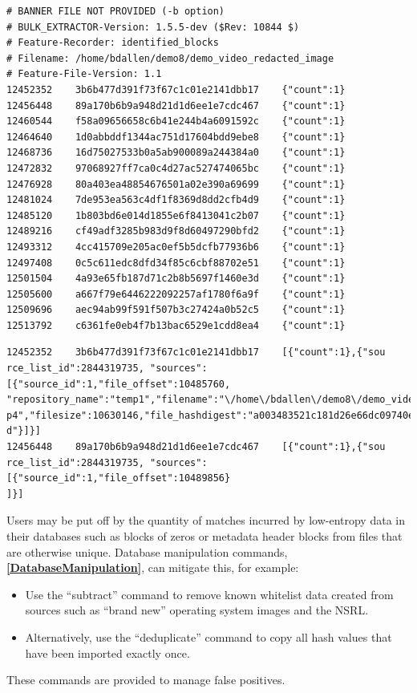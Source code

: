 \documentclass[11pt,fleqn]{article} %
\begin{document}
\lstset{style=customfile}
\begin{lstlisting}[float, caption={The \texttt{identified\_blocks.txt} file produced by \bulk's \textit{hashdb} scanner. First column is the forensic path, second is the hash value, and third is the number of times the hash value occurs in the database}, label=identifiedBlocks]
# BANNER FILE NOT PROVIDED (-b option)
# BULK_EXTRACTOR-Version: 1.5.5-dev ($Rev: 10844 $)
# Feature-Recorder: identified_blocks
# Filename: /home/bdallen/demo8/demo_video_redacted_image
# Feature-File-Version: 1.1
12452352	3b6b477d391f73f67c1c01e2141dbb17	{"count":1}
12456448	89a170b6b9a948d21d1d6ee1e7cdc467	{"count":1}
12460544	f58a09656658c6b41e244b4a6091592c	{"count":1}
12464640	1d0abbddf1344ac751d17604bdd9ebe8	{"count":1}
12468736	16d75027533b0a5ab900089a244384a0	{"count":1}
12472832	97068927ff7ca0c4d27ac527474065bc	{"count":1}
12476928	80a403ea48854676501a02e390a69699	{"count":1}
12481024	7de953ea563c4df1f8369d8dd2cfb4d9	{"count":1}
12485120	1b803bd6e014d1855e6f8413041c2b07	{"count":1}
12489216	cf49adf3285b983d9f8d60497290bfd2	{"count":1}
12493312	4cc415709e205ac0ef5b5dcfb77936b6	{"count":1}
12497408	0c5c611edc8dfd34f85c6cbf88702e51	{"count":1}
12501504	4a93e65fb187d71c2b8b5697f1460e3d	{"count":1}
12505600	a667f79e6446222092257af1780f6a9f	{"count":1}
12509696	aec94ab99f591f507b3c27424a0b52c5	{"count":1}
12513792	c6361fe0eb4f7b13bac6529e1cdd8ea4	{"count":1}
\end{lstlisting}

\begin{lstlisting}[float, caption={Two lines from the \texttt{identified\_sources.txt} file produced by post-processing the \texttt{identified\_blocks.txt} file. The third column is replaced with expaned information}, label=identifiedSourceLine]
12452352	3b6b477d391f73f67c1c01e2141dbb17	[{"count":1},{"sou
rce_list_id":2844319735, "sources":[{"source_id":1,"file_offset":10485760,
"repository_name":"temp1","filename":"\/home\/bdallen\/demo8\/demo_video.m
p4","filesize":10630146,"file_hashdigest":"a003483521c181d26e66dc09740e939
d"}]}]
12456448	89a170b6b9a948d21d1d6ee1e7cdc467	[{"count":1},{"sou
rce_list_id":2844319735, "sources":[{"source_id":1,"file_offset":10489856}
]}]
\end{lstlisting}

Users may be put off by the quantity of matches incurred by low-entropy data in their databases such as blocks of zeros or metadata header blocks from files that are otherwise unique. Database manipulation commands,
\textbf{\autoref{DatabaseManipulation}}, can mitigate this, for example:
\begin{itemize}
\item Use the ``subtract'' command to remove known whitelist data created from sources such as ``brand new'' operating system images and the NSRL.
\item Alternatively, use the ``deduplicate'' command to copy all hash values that have been imported exactly once.
\end{itemize}
These commands are provided to manage false positives.
\end{document}

